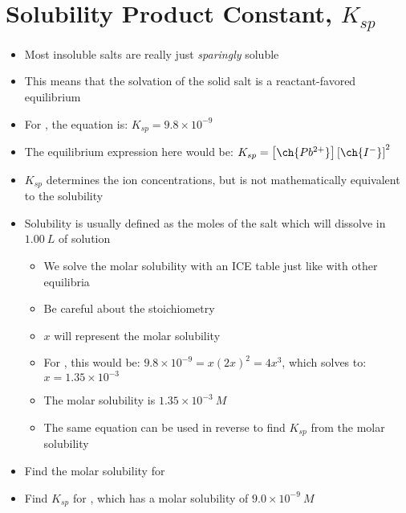 \documentclass[12pt, openany, letterpaper]{memoir}
\begin{document}
\section{Solubility Product Constant, $K_{sp}$}
\begin{itemize}
	\item Most insoluble salts are really just \emph{sparingly} soluble
	\item This means that the solvation of the solid salt is a reactant-favored equilibrium
	\item For , the equation is:  \hspace{1em} $K_{sp} = 9.8\times10^{-9}$
	\item The equilibrium expression here would be: $K_{sp}=\left[\ch{Pb^{2+}}\right]\left[\ch{I^-}\right]^2$
	\item $K_{sp}$ determines the ion concentrations, but is not mathematically equivalent to the solubility
	\item Solubility is usually defined as the moles of the salt which will dissolve in $1.00~L$ of solution
	\begin{itemize}
		\item We solve the molar solubility with an ICE table just like with other equilibria
		\item Be careful about the stoichiometry
		\item $x$ will represent the molar solubility
		\item For , this would be: $9.8\times10^{-9}=x\left(2x\right)^2 = 4x^3$, which solves to: $x = 1.35\times10^{-3}$
		\item The molar solubility is $1.35\times10^{-3}~M$
		\item The same equation can be used in reverse to find $K_{sp}$ from the molar solubility
	\end{itemize}
	\item Find the molar solubility for 
	\item Find $K_{sp}$ for , which has a molar solubility of $9.0\times10^{-9}~M$
\end{itemize}
\end{document}
